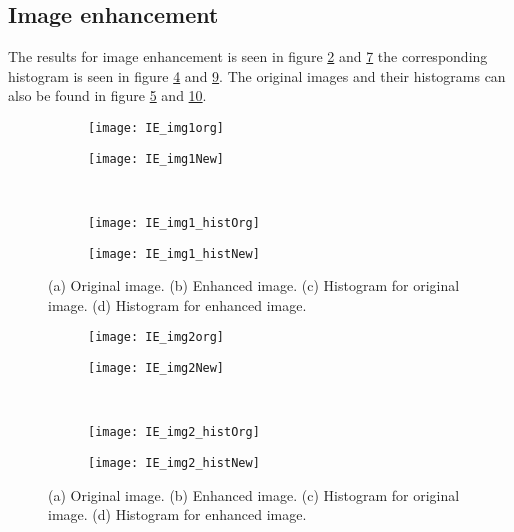 \subsection{Image enhancement}
The results for image enhancement is seen in figure \ref{fig:img1new} and \ref{fig:img2new} the corresponding histogram is seen in figure \ref{fig:img1histnew} and \ref{fig:img2histnew}. The original images and their histograms can also be found in figure \ref{fig:img1} and \ref{fig:img2}.
\begin{figure}
	\centering
	\begin{subfigure}[b]{0.4\textwidth}
		\texttt{[image: IE\_img1org]}
		\caption{}
		\label{fig:img1org}
	\end{subfigure}
	\begin{subfigure}[b]{0.4\textwidth}
		\texttt{[image: IE\_img1New]}
		\caption{}
		\label{fig:img1new}
	\end{subfigure}
	\\
	\begin{subfigure}[b]{0.4\textwidth}
		\texttt{[image: IE\_img1\_histOrg]}
		\caption{}
		\label{fig:img1historg}
	\end{subfigure}
	\begin{subfigure}[b]{0.4\textwidth}
		\texttt{[image: IE\_img1\_histNew]}
		\caption{}
		\label{fig:img1histnew}
	\end{subfigure}
	\caption{(a) Original image. (b) Enhanced image. (c) Histogram for original image. (d) Histogram for enhanced image.}
	\label{fig:img1}
\end{figure}
\begin{figure}
	\centering
	\begin{subfigure}[b]{0.4\textwidth}
		\texttt{[image: IE\_img2org]}
		\caption{}
		\label{fig:img2org}
	\end{subfigure}
	\begin{subfigure}[b]{0.4\textwidth}
		\texttt{[image: IE\_img2New]}
		\caption{}
		\label{fig:img2new}
	\end{subfigure}
	\\
	\begin{subfigure}[b]{0.4\textwidth}
		\texttt{[image: IE\_img2\_histOrg]}
		\caption{}
		\label{fig:img2historg}
	\end{subfigure}
	\begin{subfigure}[b]{0.4\textwidth}
		\texttt{[image: IE\_img2\_histNew]}
		\caption{}
		\label{fig:img2histnew}
	\end{subfigure}
	\caption{(a) Original image. (b) Enhanced image. (c) Histogram for original image. (d) Histogram for enhanced image.}
	\label{fig:img2}
\end{figure}

